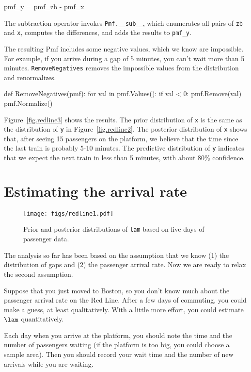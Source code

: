 \documentclass[12pt]{book}
\theoremstyle{exercise}
\newcommand{\py}[1]{{\tt #1}}%
\begin{document}
\begin{code}
    pmf_y = pmf_zb - pmf_x
\end{code}

The subtraction operator invokes \verb"Pmf.__sub__", which enumerates
all pairs of \py{zb} and \py{x}, computes the differences, and adds
the results to \verb"pmf_y".

The resulting Pmf includes some negative values, which we know are
impossible.  For example, if you arrive during a gap of 5 minutes, you
can't wait more than 5 minutes.  \py{RemoveNegatives} removes the
impossible values from the distribution and renormalizes.

\begin{code}
def RemoveNegatives(pmf):
    for val in pmf.Values():
        if val < 0:
            pmf.Remove(val)
    pmf.Normalize()
\end{code}

Figure~\ref{fig.redline3} shows the results.  The prior distribution
of \py{x} is the same as the distribution of \py{y} in
Figure~\ref{fig.redline2}.  The posterior distribution of \py{x}
shows that, after seeing 15 passengers on the platform, we believe
that the time since the last train is probably 5-10 minutes.  The
predictive distribution of \py{y} indicates that we expect the next
train in less than 5 minutes, with about 80\% confidence.


\section{Estimating the arrival rate}

\begin{figure}
\centerline{\texttt{[image: figs/redline1.pdf]}}
\caption{Prior and posterior distributions of \py{lam} based
on five days of passenger data. }
\label{fig.redline1}
\end{figure}

The analysis so far has been based on the assumption that we know (1)
the distribution of gaps and (2) the passenger arrival rate.  Now we
are ready to relax the second assumption.

Suppose that you just moved to Boston, so you don't know much about
the passenger arrival rate on the Red Line.  After a few days of
commuting, you could make a guess, at least qualitatively.  With
a little more effort, you could estimate $\lam$ quantitatively.

Each day when you arrive at the platform, you should note the
time and the number of passengers waiting (if the platform is too
big, you could choose a sample area).  Then you should record your
wait time and the
number of new arrivals while you are waiting.
\end{document}
